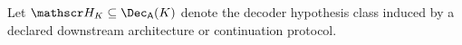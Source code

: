 Let $\mathscr H_K\subseteq\Dec_{\mathsf A}(K)$ denote the decoder hypothesis class induced by a declared downstream architecture or continuation protocol.
